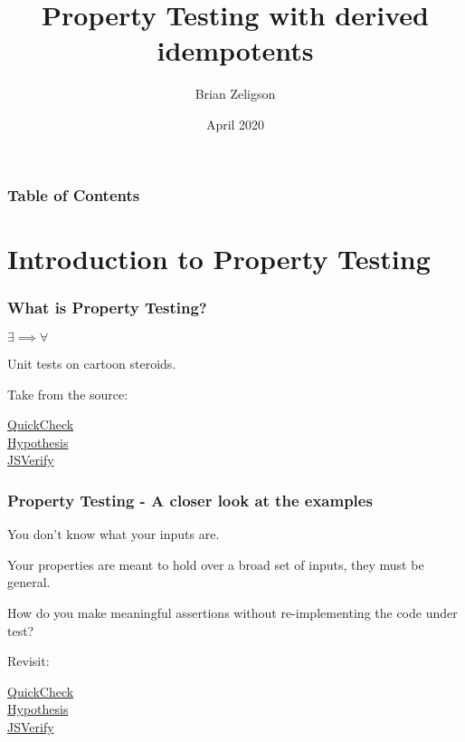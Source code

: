 \documentclass{beamer}
\title{Property Testing with derived idempotents}
\author{Brian Zeligson}
\date{April 2020}
\begin{document}
\frame{\titlepage}

\begin{frame}
\frametitle{Table of Contents}
\tableofcontents
\end{frame}

\section{Introduction to Property Testing}
\begin{frame}
\frametitle{What is Property Testing?}
{$\exists \implies \forall$} \\ \pause
\medskip

Unit tests on cartoon steroids. \\ \pause
\medskip

Take from the source: \\
\medskip

\href{http://www.cse.chalmers.se/~rjmh/QuickCheck/manual.html}{QuickCheck} \\
\href{https://hypothesis.readthedocs.io/en/latest/}{Hypothesis} \\
\href{https://jsverify.github.io/}{JSVerify} \\

\end{frame}

\begin{frame}
\frametitle{Property Testing - A closer look at the examples}

You don't know what your inputs are. \\ \pause
\medskip

Your properties are meant to hold over a broad set of inputs, they must be general. \\ \pause
\medskip

How do you make meaningful assertions without re-implementing the code under test? \\ \pause
\medskip

Revisit: \\
\medskip

\href{http://www.cse.chalmers.se/~rjmh/QuickCheck/manual.html}{QuickCheck} \\
\href{https://hypothesis.readthedocs.io/en/latest/}{Hypothesis} \\
\href{https://jsverify.github.io/}{JSVerify} \\

\end{frame}
\end{document}
